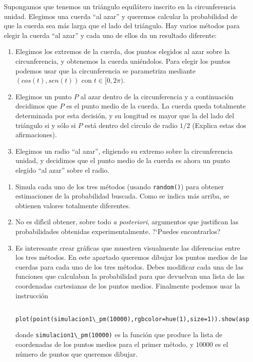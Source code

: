  Supongamos que tenemos un tri\'angulo equil\'atero inscrito en la
circunferencia unidad. Elegimos una cuerda  ``al azar'' y queremos {\sc calcular
la probabilidad}  de que la cuerda sea m\'as larga que el lado del tri\'angulo. 
Hay varios m\'etodos para elegir la cuerda ``al azar'' y cada uno de ellos da un
resultado diferente:
 \begin{enumerate}
 \item Elegimos los extremos de la cuerda, dos puntos elegidos al azar sobre la
circunferencia, y obtenemos la cuerda uni\'endolos. Para elegir los puntos
podemos usar que la circunferencia se parametriza mediante $(cos(t),sen(t))$ con
$t\in [0,2\pi).$  
 \item Elegimos un punto $P$ al azar dentro de la circunferencia y a
continuaci\'on decidimos que $P$ es el punto medio de la cuerda. La cuerda queda
totalmente determinada por esta decisi\'on, y su longitud es mayor que la del
lado del tri\'angulo si y s\'olo si $P$ est\'a dentro del c\'{\i}rculo de radio
$1/2$ (Explica estas dos afirmaciones). 
 \item  Elegimos un radio ``al azar'', eligiendo su extremo sobre la
circunferencia unidad, y decidimos que el punto medio de la cuerda es ahora un
punto elegido ``al azar''  sobre el radio. 
 \end{enumerate}
 \bigskip
\begin{ejer}
 \begin{enumerate}
 \item  Simula cada uno de los tres m\'etodos (usando {\tt random()}) para
obtener estimaciones de la probabilidad buscada. Como se indica m\'as arriba, se
obtienen valores totalmente diferentes. 
 \item No es dif\'{\i}cil obtener, sobre todo {\itshape a posteriori},
argumentos que justifican las probabilidades obtenidas experimentalmente.
?`Puedes encontrarlos?
 \item Es interesante crear gr\'aficas que muestren visualmente las diferencias
entre los tres m\'etodos. En este apartado queremos dibujar los puntos medios de
las cuerdas para cada uno de los tres m\'etodos. Debes modificar cada una de las
funciones que calculaban la probabilidad  para que devuelvan una lista de las
coordenadas cartesianas de los puntos medios.  Finalmente podemos usar la
instrucci\'on 
 \begin{lstlisting}
 plot(point(simulacion1\_pm(10000),rgbcolor=hue(1),size=1)).show(aspect_ratio=1)
 \end{lstlisting}
 \noindent donde \lstinline|simulacion1\_pm(10000)| es la funci\'on que produce
la
lista de coordenadas de los puntos medios para el primer m\'etodo, y $10000$ es
el n\'umero de puntos que queremos dibujar.
 \end{enumerate}
 \end{ejer}
 
